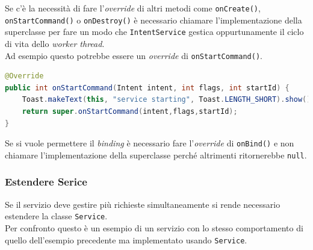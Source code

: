 Se c'è la necessità di fare l'\textit{override} di altri metodi come \texttt{onCreate()}, \texttt{onStartCommand()} o \texttt{onDestroy()} è necessario chiamare l'implementazione della superclasse per fare un modo che \texttt{IntentService} gestica oppurtunamente il ciclo di vita dello \textit{worker thread}.\\
Ad esempio questo potrebbe essere un \textit{override} di \texttt{onStartCommand()}.
\begin{lstlisting}[language=Java]
@Override
public int onStartCommand(Intent intent, int flags, int startId) {
    Toast.makeText(this, "service starting", Toast.LENGTH_SHORT).show();
    return super.onStartCommand(intent,flags,startId);
}
\end{lstlisting}

Se si vuole permettere il \textit{binding} è necessario fare l'\textit{override} di \texttt{onBind()} e non chiamare l'implementazione della superclasse perché altrimenti ritornerebbe \texttt{null}.\\


\subsubsection{Estendere Serice}
Se il servizio deve gestire più richieste simultaneamente si rende necessario estendere la classe \texttt{Service}.\\
Per confronto questo è un esempio di un servizio con lo stesso comportamento di quello dell'esempio precedente ma implementato usando \texttt{Service}.

